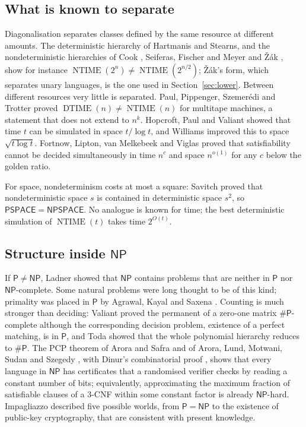 \documentclass[11pt,reqno]{amsart}
\numberwithin{equation}{section}
\theoremstyle{plain}
\theoremstyle{definition}
\theoremstyle{remark}
\DeclareMathOperator{\NTIME}{NTIME}
\DeclareMathOperator{\DTIME}{DTIME}
\newcommand{\Pc}{\mathsf{P}}
\newcommand{\NP}{\mathsf{NP}}
\begin{document}
\subsection{What is known to separate}
Diagonalisation separates classes defined by the same resource at different
amounts. The deterministic hierarchy of Hartmanis and Stearns, and the
nondeterministic hierarchies of Cook \cite{Coo73}, Seiferas, Fischer and Meyer
\cite{SFM78} and \v{Z}\'ak \cite{Zak83}, show for instance
$\NTIME(2^n)\ne\NTIME(2^{n/2})$; \v{Z}\'ak's form, which separates unary
languages, is the one used in Section~\ref{sec:lower}. Between different
resources very little is separated. Paul, Pippenger, Szemer\'edi and Trotter
\cite{PPST83} proved $\DTIME(n)\ne\NTIME(n)$ for multitape machines, a statement
that does not extend to $n^k$. Hopcroft, Paul and Valiant \cite{HPV77} showed
that time $t$ can be simulated in space $t/\log t$, and Williams \cite{Wil25}
improved this to space $\sqrt{t\log t}$. Fortnow, Lipton, van Melkebeek and
Viglas \cite{FLMV05} proved that satisfiability cannot be decided
simultaneously in time $n^c$ and space $n^{o(1)}$ for any $c$ below the golden
ratio.

For space, nondeterminism costs at most a square: Savitch \cite{Sav70} proved
that nondeterministic space $s$ is contained in deterministic space $s^2$, so
$\mathsf{PSPACE}=\mathsf{NPSPACE}$. No analogue is known for time; the best
deterministic simulation of $\NTIME(t)$ takes time $2^{O(t)}$.

\subsection{Structure inside $\NP$}
If $\Pc\ne\NP$, Ladner \cite{Lad75} showed that $\NP$ contains problems that are
neither in $\Pc$ nor $\NP$-complete. Some natural problems were long thought to
be of this kind; primality was placed in $\Pc$ by Agrawal, Kayal and Saxena
\cite{AKS04}. Counting is much stronger than deciding: Valiant \cite{Val79b}
proved the permanent of a zero-one matrix $\#\Pc$-complete although the
corresponding decision problem, existence of a perfect matching, is in $\Pc$,
and Toda \cite{Tod91} showed that the whole polynomial hierarchy reduces to
$\#\Pc$. The PCP theorem of Arora and Safra \cite{AS98} and of Arora, Lund,
Motwani, Sudan and Szegedy \cite{ALMSS98}, with Dinur's combinatorial proof
\cite{Din07}, shows that every language in $\NP$ has certificates that a
randomised verifier checks by reading a constant number of bits; equivalently,
approximating the maximum fraction of satisfiable clauses of a $3$-CNF within
some constant factor is already $\NP$-hard. Impagliazzo \cite{Imp95} described
five possible worlds, from $\Pc=\NP$ to the existence of public-key
cryptography, that are consistent with present knowledge.
\end{document}
